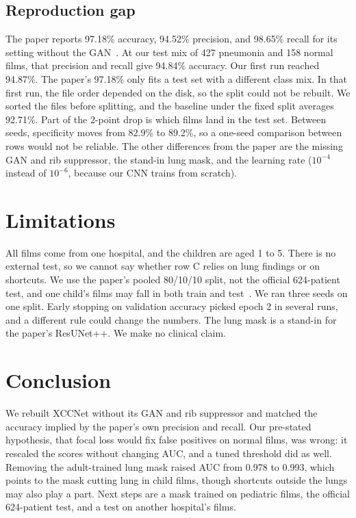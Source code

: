 \documentclass[conference]{IEEEtran}
\begin{document}
\subsection{Reproduction gap}
The paper reports 97.18\% accuracy, 94.52\% precision, and 98.65\% recall for its setting without the GAN~\cite{raghaw2024}. At our test mix of 427 pneumonia and 158 normal films, that precision and recall give 94.84\% accuracy. Our first run reached 94.87\%. The paper's 97.18\% only fits a test set with a different class mix. In that first run, the file order depended on the disk, so the split could not be rebuilt. We sorted the files before splitting, and the baseline under the fixed split averages 92.71\%. Part of the 2-point drop is which films land in the test set. Between seeds, specificity moves from 82.9\% to 89.2\%, so a one-seed comparison between rows would not be reliable. The other differences from the paper are the missing GAN and rib suppressor, the stand-in lung mask, and the learning rate ($10^{-4}$ instead of $10^{-6}$, because our CNN trains from scratch).

\section{Limitations}
All films come from one hospital, and the children are aged 1 to 5. There is no external test, so we cannot say whether row C relies on lung findings or on shortcuts. We use the paper's pooled 80/10/10 split, not the official 624-patient test, and one child's films may fall in both train and test~\cite{salehi2021}. We ran three seeds on one split. Early stopping on validation accuracy picked epoch 2 in several runs, and a different rule could change the numbers. The lung mask is a stand-in for the paper's ResUNet++. We make no clinical claim.

\section{Conclusion}
We rebuilt XCCNet without its GAN and rib suppressor and matched the accuracy implied by the paper's own precision and recall. Our pre-stated hypothesis, that focal loss would fix false positives on normal films, was wrong: it rescaled the scores without changing AUC, and a tuned threshold did as well. Removing the adult-trained lung mask raised AUC from 0.978 to 0.993, which points to the mask cutting lung in child films, though shortcuts outside the lungs may also play a part. Next steps are a mask trained on pediatric films, the official 624-patient test, and a test on another hospital's films.
\end{document}

